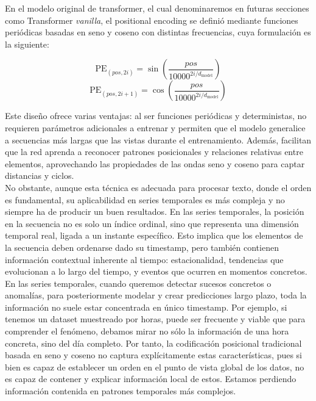 En el modelo original de transformer, el cual denominaremos en futuras secciones como Transformer \textit{vanilla}, el positional encoding se definió mediante funciones periódicas basadas en seno y coseno con distintas frecuencias, cuya formulación es la siguiente:

\begin{equation}
	\text{PE}_{(pos, 2i)} = \sin\left( \frac{pos}{10000^{2i/d_{\text{model}}}} \right)
\end{equation}
\begin{equation}
	\text{PE}_{(pos, 2i+1)} = \cos\left( \frac{pos}{10000^{2i/d_{\text{model}}}} \right)
\end{equation}

Este diseño ofrece varias ventajas: al ser funciones periódicas y deterministas, no requieren parámetros adicionales a entrenar y permiten que el modelo generalice a secuencias más largas que las vistas durante el entrenamiento. Además, facilitan que la red aprenda a reconocer patrones posicionales y relaciones relativas entre elementos, aprovechando las propiedades de las ondas seno y coseno para captar distancias y ciclos.\\

No obstante, aunque esta técnica es adecuada para procesar texto, donde el orden es fundamental, su aplicabilidad en series temporales es más compleja y no siempre ha de producir un buen resultados. En las series temporales, la posición en la secuencia no es solo un índice ordinal, sino que representa una dimensión temporal real, ligada a un instante específico. Esto implica que los elementos de la secuencia deben ordenarse dado su timestamp, pero también contienen información contextual inherente al tiempo: estacionalidad, tendencias que evolucionan a lo largo del tiempo, y eventos que ocurren en momentos concretos.\\

En las series temporales, cuando queremos detectar sucesos concretos o anomalías, para posteriormente modelar y crear predicciones largo plazo, toda la información no suele estar concentrada en único timestamp. Por ejemplo, si tenemos un dataset muestreado por horas, puede ser frecuente y viable que para comprender el fenómeno, debamos mirar no sólo la información de una hora concreta, sino del día completo. Por tanto, la codificación posicional tradicional basada en seno y coseno no captura explícitamente estas características, pues si bien es capaz de establecer un orden en el punto de vista global de los datos, no es capaz de contener y explicar información local de estos. 	Estamos perdiendo información contenida en patrones temporales más complejos.\\

